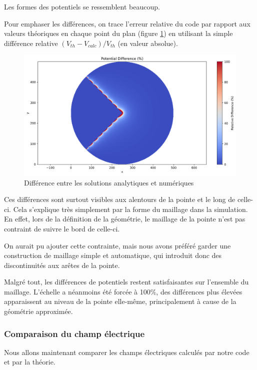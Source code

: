 \documentclass{article}
\begin{document}
Les formes des potentiels se ressemblent beaucoup.

Pour emphaser les différences, on trace l'erreur relative
du code par rapport aux valeurs théoriques en chaque point du plan
(figure \ref{fig:diff}) en utilisant la simple différence
relative $(V_{th} - V_{calc}) / V_{th}$ (en valeur absolue).

\begin{figure}[!h]
    \centering
    \includegraphics[width=\textwidth]{img/difference.png}
    \caption{Différence entre les solutions analytiques et numériques}
    \label{fig:diff}
\end{figure}

Ces différences sont surtout visibles aux alentours de la pointe
et le long de celle-ci. Cela s'explique très simplement par
la forme du maillage dans la simulation. En effet, lors de la
définition de la géométrie, le maillage de la pointe n'est pas
contraint de suivre le bord de celle-ci.

On aurait pu ajouter
cette contrainte, mais nous avons préféré garder une construction
de maillage simple et automatique, qui introduit donc des 
discontinuités aux arêtes de la pointe.

Malgré tout, les différences de potentiels restent satisfaisantes
sur l'ensemble du maillage. L'échelle a néanmoins
été forcée à 100\%, des différences plus élevées apparaissent au niveau
de la pointe elle-même, principalement à cause de la géométrie
approximée.

\newpage

\subsubsection{Comparaison du champ électrique}

Nous allons maintenant comparer les champs électriques
calculés par notre code et par la théorie.
\end{document}
